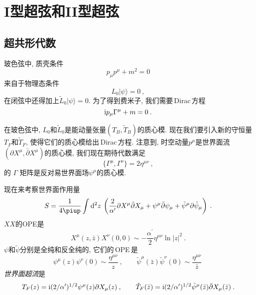 

\setcounter{section}{0}%
\setcounter{chapter}{9}

\chapter{I型超弦和II型超弦}


\section{超共形代数}

玻色弦中, 质壳条件
\begin{equation}
    p_{\mu}p^{\mu}+m^{2}=0 \label{10.1.1}
\end{equation}
来自于物理态条件
\begin{equation}
    L_{0}\lvert \psi\rangle = 0\: , \label{10.1.2}
\end{equation}
在闭弦中还得加上$ \tilde{L}_{0}\lvert\psi\rangle=0 $. 为了得到费米子, 我们需要\,Dirac\,方程
\begin{equation}
    \mathrm{i} p_{\mu} \Gamma^{\mu}+m=0\:. \label{10.1.3}
\end{equation}

在玻色弦中, $L_{0} $和$ \tilde{L}_{0} $是能动量张量$(T_{B},\tilde{T}_{B})$的质心模. 现在我们要引入新的守恒量$ T_{F} $和$ \tilde{T}_{F} $, 使得它们的质心模给出\,Dirac\,方程. 注意到, 时空动量$ p^{\mu} $是世界面流$(\partial X^{\mu},\bar{\partial}X^{\mu} )$的质心模, 我们现在期待代数满足
\begin{equation}
    \{\Gamma^{\mu},\Gamma^{\nu}\}=2\eta^{\mu\nu} \:, \label{10.1.4}
\end{equation}
的 $\Gamma$ 矩阵是反对易世界面场$ \psi^{\mu} $的质心模.

现在来考察世界面作用量
\begin{equation}
    S=\frac{1}{4\uppi}\int\dif^{2}z \:
    \left(
    \frac{2}{\alpha^{\prime}}\partial X^{\mu}\bar{\partial}X_{\mu} +\psi^{\mu}\bar{\partial}\psi_{\mu}
    +\tilde{\psi}^{\mu}\partial\tilde{\psi}_{\mu}
    \right)\:.\label{10.1.5}
\end{equation}
$XX $的OPE是
\begin{equation}
    X^{\mu}(z,\bar{z})X^{\nu}(0,0)\sim -\frac{\alpha^{\prime}}{2}\eta^{\mu\nu}\ln\lvert z\rvert^{2}\:.\label{10.1.6}
\end{equation}
$\psi $和$ \tilde{\psi} $分别是全纯和反全纯的, 它们的\,OPE\,是
\begin{equation}
    \psi^{\mu}(z)\psi^{\nu}(0)\sim\frac{\eta^{\mu\nu}}{z}\:,\qquad
     \tilde{\psi}^{\mu}(\bar{z})\tilde{\psi}^{\nu}(0)\sim\frac{\eta^{\mu\nu}}{\bar{z}}\: \label{10.1.7}
\end{equation}
{\emph{世界面超流}}是
\begin{equation}
    T_{F}(z)=\mathrm{i}(2/\alpha^{\prime})^{1/2}\psi^{\mu}(z)\partial X_{\mu}(z)\:,\qquad
     \tilde{T}_{F}(\bar{z})=\mathrm{i}(2/\alpha^{\prime})^{1/2}\tilde{\psi}^{\mu}(\bar{z})\bar{\partial} X_{\mu}(\bar{z})
     \:.\label{10.1.8}
\end{equation}

